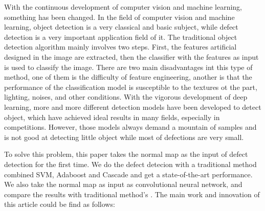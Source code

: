 \begin{englishabstract}

With the continuous development of computer vision and machine learning,
something has been changed.
In the field of computer vision and machine learning, object detection is a very classical and basic subject, while defect detection is a very important application field of it. 
The traditional object detection algorithm mainly involves two steps. First, the features artificial designed in the image are extracted, then the classifier with the features as input is used to classify the image. There are two main disadvantages int this type of method, one of them is the difficulty of feature engineering, another is that the performance of the classification model is susceptible to the textures ot the part, lighting, noises, and other conditions.
With the vigorous development of deep learning, more and more different detection models have been developed to detect object, which have achieved ideal results in many fields, especially in competitions. 
However, those models always demand a mountain of samples and is not good at detecting little object while most of defections are very small.

To solve this problem, this paper takes the normal map as the input of defect detection for the first time. We do the defect detecion with a traditional method combined SVM, Adaboost and Cascade and get a state-of-the-art performance. We also take the normal map as input as convolutional neural network, and compare the results with traditional method's .
The main work and innovation of this article could be find as follows:


\end{englishabstract}
